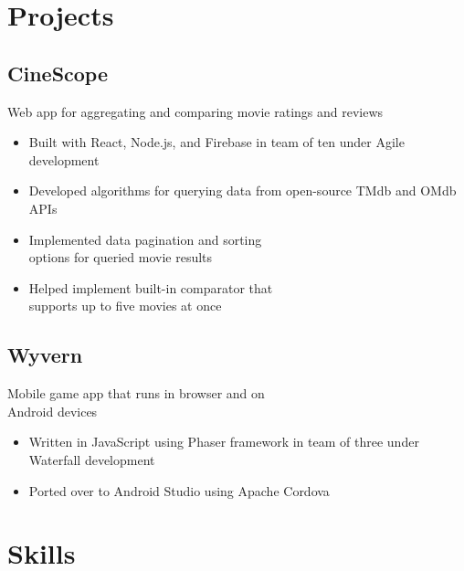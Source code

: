 \documentclass{article}
\begin{document}
\setlength{\columnsep}{1.5cm} 		%
\setlength{\columnseprule}{0.2pt} 	%
\begin{paracol}{2} 			%

\vspace{-2em}
\section{Projects}

\vspace{-0.5em}
\subsection{CineScope} \hfill

{\color{NavyBlue} Web app for aggregating and comparing movie \indent ratings and reviews}
\begin{itemize}
	\item Built with React, Node.js, and Firebase in team of ten under Agile development
	\item Developed algorithms for querying data from open-source TMdb and OMdb APIs
	\item Implemented data pagination and sorting\\options for queried movie results
	\item Helped implement built-in comparator that\\supports up to five movies at once
\end{itemize}

\subsection{Wyvern} \hfill

{\color{NavyBlue} Mobile game app that runs in browser and on \\\indent Android devices}
\begin{itemize}
	\item Written in JavaScript using Phaser framework in team of three under Waterfall development
	\item Ported over to Android Studio using Apache Cordova
\end{itemize}

\switchcolumn
\vspace{-2em}
\section{Skills}


\end{paracol}
\end{document}
